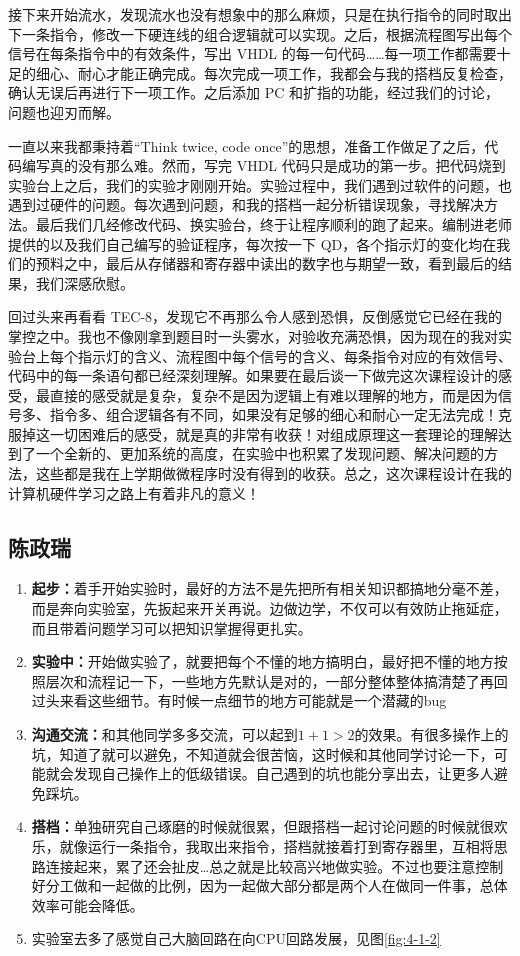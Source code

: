 \documentclass[12pt]{article}
\begin{document}
{	接下来开始流水，发现流水也没有想象中的那么麻烦，只是在执行指令的同时取出下一条指令，修改一下硬连线的组合逻辑就可以实现。之后，根据流程图写出每个信号在每条指令中的有效条件，写出 VHDL 的每一句代码……每一项工作都需要十足的细心、耐心才能正确完成。每次完成一项工作，我都会与我的搭档反复检查，确认无误后再进行下一项工作。之后添加 PC 和扩指的功能，经过我们的讨论，问题也迎刃而解。
	
	一直以来我都秉持着“Think twice, code once”的思想，准备工作做足了之后，代码编写真的没有那么难。然而，写完 VHDL 代码只是成功的第一步。把代码烧到实验台上之后，我们的实验才刚刚开始。实验过程中，我们遇到过软件的问题，也遇到过硬件的问题。每次遇到问题，和我的搭档一起分析错误现象，寻找解决方法。最后我们几经修改代码、换实验台，终于让程序顺利的跑了起来。编制进老师提供的以及我们自己编写的验证程序，每次按一下 QD，各个指示灯的变化均在我们的预料之中，最后从存储器和寄存器中读出的数字也与期望一致，看到最后的结果，我们深感欣慰。
	
	回过头来再看看 TEC-8，发现它不再那么令人感到恐惧，反倒感觉它已经在我的掌控之中。我也不像刚拿到题目时一头雾水，对验收充满恐惧，因为现在的我对实验台上每个指示灯的含义、流程图中每个信号的含义、每条指令对应的有效信号、代码中的每一条语句都已经深刻理解。如果要在最后谈一下做完这次课程设计的感受，最直接的感受就是复杂，复杂不是因为逻辑上有难以理解的地方，而是因为信号多、指令多、组合逻辑各有不同，如果没有足够的细心和耐心一定无法完成！克服掉这一切困难后的感受，就是真的非常有收获！对组成原理这一套理论的理解达到了一个全新的、更加系统的高度，在实验中也积累了发现问题、解决问题的方法，这些都是我在上学期做微程序时没有得到的收获。总之，这次课程设计在我的计算机硬件学习之路上有着非凡的意义！
	
    \subsection{陈政瑞}
    \begin{enumerate}
        \item \textbf{起步：}着手开始实验时，最好的方法不是先把所有相关知识都搞地分毫不差，而是奔向实验室，先扳起来开关再说。边做边学，不仅可以有效防止拖延症，而且带着问题学习可以把知识掌握得更扎实。
        \item \textbf{实验中：}开始做实验了，就要把每个不懂的地方搞明白，最好把不懂的地方按照层次和流程记一下，一些地方先默认是对的，一部分整体整体搞清楚了再回过头来看这些细节。有时候一点细节的地方可能就是一个潜藏的bug
        \item \textbf{沟通交流：}和其他同学多多交流，可以起到$1+1>2$的效果。有很多操作上的坑，知道了就可以避免，不知道就会很苦恼，这时候和其他同学讨论一下，可能就会发现自己操作上的低级错误。自己遇到的坑也能分享出去，让更多人避免踩坑。
        \item \textbf{搭档：}单独研究自己琢磨的时候就很累，但跟搭档一起讨论问题的时候就很欢乐，就像运行一条指令，我取出来指令，搭档就接着打到寄存器里，互相将思路连接起来，累了还会扯皮…总之就是比较高兴地做实验。不过也要注意控制好分工做和一起做的比例，因为一起做大部分都是两个人在做同一件事，总体效率可能会降低。
        \item 实验室去多了感觉自己大脑回路在向CPU回路发展，见图\ref{fig:4-1-2}
    \end{enumerate}
    
}
\end{document}
